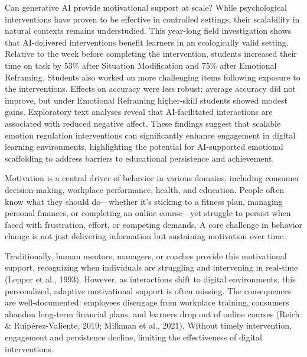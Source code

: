 \documentclass[11pt]{report}
\begin{document}
\begin{mainf}
Can generative AI provide motivational support at scale? 
While psychological interventions have proven to be effective in controlled settings, their scalability in natural contexts remains understudied. 
This year-long field investigation shows that AI-delivered interventions benefit learners in an ecologically valid setting.
Relative to the week before completing the intervention, students increased their time on task by 53\% after Situation Modification and 75\% after Emotional Reframing. 
Students also worked on more challenging items following exposure to the interventions.
Effects on accuracy were less robust: average accuracy did not improve, but under Emotional Reframing higher-skill students showed modest gains.
Exploratory text analyses reveal that AI-facilitated interactions are associated with reduced negative affect.
These findings suggest that scalable emotion regulation interventions can significantly enhance engagement in digital learning environments, highlighting the potential for AI-supported emotional scaffolding to address barriers to educational persistence and achievement.


Motivation is a central driver of behavior in various domains, including consumer decision-making, workplace performance, health, and education. 
People often know what they should do---whether it’s sticking to a fitness plan, managing personal finances, or completing an online course---yet struggle to persist when faced with frustration, effort, or competing demands. 
A core challenge in behavior change is not just delivering information but sustaining motivation over time.


Traditionally, human mentors, managers, or coaches provide this motivational support, recognizing when individuals are struggling and intervening in real-time (Lepper et al., 1993). 
However, as interactions shift to digital environments, this personalized, adaptive motivational support is often missing. 
The consequences are well-documented: employees disengage from workplace training, consumers abandon long-term financial plans, and learners drop out of online courses (Reich \& Ruipérez-Valiente, 2019; Milkman et al., 2021). 
Without timely intervention, engagement and persistence decline, limiting the effectiveness of digital interventions.


\end{mainf}
\end{document}
